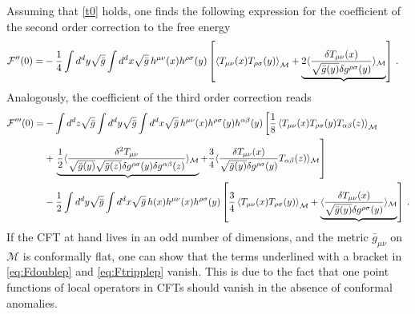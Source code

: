 \documentclass[12pt]{article}
\numberwithin{equation}{section}
\begin{document}
Assuming that \eqref{t0} holds, one finds the following expression for the coefficient of the second order correction to the free energy
%
\begin{align}\label{eq:Fdoublep}
\mathcal{F}''(0)=&-\frac{1}{4}\int d^d y \sqrt{\bar g}\int d^d x \sqrt{\bar g}\,h^{\mu\nu}(x)h^{\rho\sigma}(y)  \left[  \braket{T_{\mu\nu}(x)T_{\rho\sigma}(y)}_{\mathcal{M}}+\underbrace{ 2  \langle\frac{\delta T_{\mu\nu}(x)}{\sqrt{\bar{g}(y)}\delta g^{\rho\sigma}(y)}\rangle_{\mathcal{M}}}\right]
\, .
\end{align}
%
Analogously, the coefficient of the third order correction reads
%
\begin{align}\label{eq:Ftripplep}
\mathcal{F}'''(0)=&-\int d^d z \sqrt{\bar g}\int d^d y \sqrt{\bar g}\int d^d x \sqrt{\bar g}\,h^{\mu\nu}(x)h^{\rho\sigma}(y)h^{\alpha\beta}(y)  \left[\frac{1}{8}\braket{T_{\mu\nu}(x)T_{\rho\sigma}(y)T_{\alpha\beta}(z)}_{\mathcal{M}}\right.\\ \notag
&+\left. \underbrace{\frac{1}{2} \langle \frac{\delta^2 T_{\mu\nu}}{\sqrt{\bar{g}(y)}\sqrt{\bar{g}(z)}\delta g^{\rho\sigma}(y)\delta g^{\alpha\beta}(z)}\rangle_{\mathcal{M}}} +\frac{3}{4} \langle\frac{\delta T_{\mu\nu}(x)}{\sqrt{\bar{g}(y)}\delta g^{\rho \sigma}(y)}T_{\alpha\beta}(z)\rangle_{\mathcal{M}}\right]\\ \notag & -\frac{1}{2}\int d^d y\sqrt{\bar g}\int d^d x \sqrt{\bar g} \, h(x) h^{\mu\nu}(x) h^{\rho\sigma}(y) \left[ \frac{3}{4}\braket{T_{\mu\nu}(x)T_{\rho\sigma}(y)}_{\mathcal{M}}+\underbrace{\langle\frac{\delta T_{\mu\nu}(x)}{\sqrt{\bar{g}(y)}\delta g^{\rho\sigma}(y)}\rangle_{\mathcal{M}}}\right]
\, .
\end{align}
%
If the CFT at hand lives in an odd number of dimensions, and the metric $\bar{g}_{\mu\nu}$ on $\mathcal{M}$ is conformally flat, one can show that the terms underlined with a bracket in \eqref{eq:Fdoublep} and \eqref{eq:Ftripplep} vanish. This is due to the fact that one point functions of local operators in CFTs should vanish in the absence of conformal anomalies.
\end{document}
